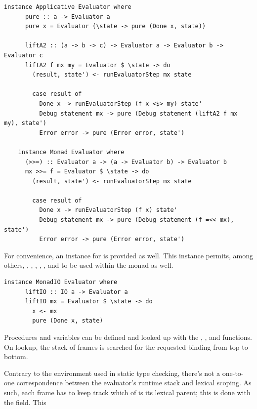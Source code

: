 \documentclass[UdineBachThesis,american,11pt]{PhdThesis}
\begin{document}
  \begin{lstlisting}[gobble=4,basicstyle=\ttfamily\small]
    instance Applicative Evaluator where
      pure :: a -> Evaluator a
      pure x = Evaluator (\state -> pure (Done x, state))

      liftA2 :: (a -> b -> c) -> Evaluator a -> Evaluator b -> Evaluator c
      liftA2 f mx my = Evaluator $ \state -> do
        (result, state') <- runEvaluatorStep mx state

        case result of
          Done x -> runEvaluatorStep (f x <$> my) state'
          Debug statement mx -> pure (Debug statement (liftA2 f mx my), state')
          Error error -> pure (Error error, state')

    instance Monad Evaluator where
      (>>=) :: Evaluator a -> (a -> Evaluator b) -> Evaluator b
      mx >>= f = Evaluator $ \state -> do
        (result, state') <- runEvaluatorStep mx state

        case result of
          Done x -> runEvaluatorStep (f x) state'
          Debug statement mx -> pure (Debug statement (f =<< mx), state')
          Error error -> pure (Error error, state')
  \end{lstlisting}

  For convenience, an instance for \lstinline@MonadIO@ is provided as well. This
  instance permits, among others, \lstinline@newRef@, \lstinline@readRef@,
  \lstinline@writeRef@, \lstinline@cloneRef@, \lstinline@compareRefs@,
  \lstinline@cloneVals@ and \lstinline@compareVals@ to be used within the
  \lstinline@Evaluator@ monad as well.

  \begin{lstlisting}[gobble=4,basicstyle=\ttfamily\small]
    instance MonadIO Evaluator where
      liftIO :: IO a -> Evaluator a
      liftIO mx = Evaluator $ \state -> do
        x <- mx
        pure (Done x, state)
  \end{lstlisting}

  Procedures and variables can be defined and looked up with the
  \lstinline@defineFun@, \lstinline@lookupFun@, \lstinline@defineVar@ and
  \lstinline@lookupVar@ functions. On lookup, the stack of frames is searched
  for the requested binding from top to bottom.

  Contrary to the environment used in static type checking, there's not a
  one-to-one correspondence between the evaluator's runtime stack and lexical
  scoping. As such, each frame has to keep track which of is its lexical parent;
  this is done with the \lstinline@offset@ field. This \linebreak
\end{document}
